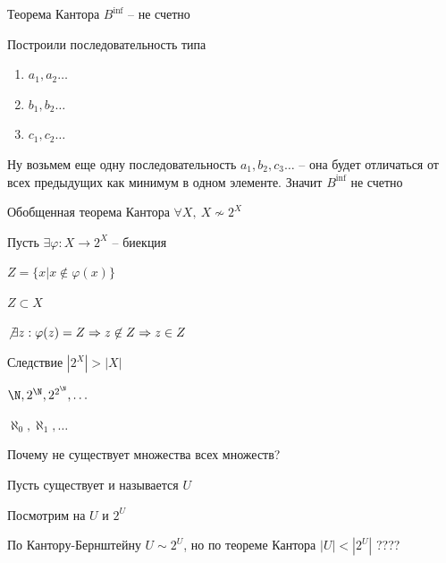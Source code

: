\documentclass[12pt]{article}
\begin{document}
\begin{theo}{Теорема Кантора}
    $B^{\inf}$ -- не счетно
\end{theo}

\begin{Proof}{}

Построили последовательность типа 

\begin{enumerate}
    \item $a_1, a_2 \ldots$
    \item $b_1, b_2 \ldots$
    \item $c_1, c_2 \ldots$
\end{enumerate}

Ну возьмем еще одну последовательность $a_1, b_2, c_3 \ldots$ -- она будет отличаться от всех предыдущих как минимум в одном элементе. Значит $B^{\inf}$ не счетно

\end{Proof}

\begin{theo}{Обобщенная теорема Кантора}
    $\forall X,\ X \not\sim 2^X$
\end{theo}

\begin{Proof}{}

Пусть $\exists \varphi : X \rightarrow 2^X$ -- биекция

$Z = \{ x | x \not\in \varphi(x) \}$

$Z \subset X$

$\not\exists z : \varphi(z) = Z \Rightarrow z \not\in Z \Rightarrow z \in Z$

\end{Proof}

\begin{theo}{Следствие}
    $|2^X| > |X|$

    $\N, 2^{\N}, 2^{2^{\N}}, \ldots$

    $\aleph_0, \aleph_1, \ldots$
\end{theo}

\begin{Remark}{}
    Почему не существует множества всех множеств?

    Пусть существует и называется $U$

    Посмотрим на $U$ и $2^U$

    По Кантору-Бернштейну $U \sim 2^U$, но по теореме Кантора $|U| < |2^U|$ ???? 
\end{Remark}
\end{document}
